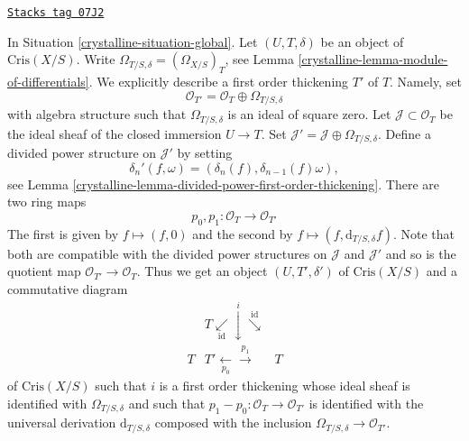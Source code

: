 \begin{remark}
\label{crystalline-remark-first-order-thickening}
\href{https://stacks.math.columbia.edu/tag/07J2}{\texttt{Stacks tag 07J2}}

In Situation \ref{crystalline-situation-global}.
Let $(U, T, \delta)$ be an object of $\text{Cris}(X/S)$.
Write $\Omega_{T/S, \delta} = (\Omega_{X/S})_T$, see
Lemma \ref{crystalline-lemma-module-of-differentials}.
We explicitly describe a first order thickening $T'$ of
$T$. Namely, set
$$
\mathcal{O}_{T'} = \mathcal{O}_T \oplus \Omega_{T/S, \delta}
$$
with algebra structure such that $\Omega_{T/S, \delta}$ is an
ideal of square zero. Let $\mathcal{J} \subset \mathcal{O}_T$
be the ideal sheaf of the closed immersion $U \to T$. Set
$\mathcal{J}' = \mathcal{J} \oplus \Omega_{T/S, \delta}$.
Define a divided power structure on $\mathcal{J}'$ by setting
$$
\delta_n'(f, \omega) = (\delta_n(f), \delta_{n - 1}(f)\omega),
$$
see Lemma \ref{crystalline-lemma-divided-power-first-order-thickening}.
There are two ring maps
$$
p_0, p_1 : \mathcal{O}_T \to \mathcal{O}_{T'}
$$
The first is given by $f \mapsto (f, 0)$ and the second by
$f \mapsto (f, \text{d}_{T/S, \delta}f)$. Note that both are compatible
with the divided power structures on $\mathcal{J}$ and $\mathcal{J}'$
and so is the quotient map $\mathcal{O}_{T'} \to \mathcal{O}_T$.
Thus we get an object $(U, T', \delta')$ of $\text{Cris}(X/S)$
and a commutative diagram
$$
\begin{array}{ccc} & T \underset{\text{id}}{\swarrow}\overset{i}{\downarrow}\overset{\text{id}}{\searrow} &  \\ T & T' \underset{p_0}{\longleftarrow}\overset{p_1}{\longrightarrow} & T\end{array}
$$
of $\text{Cris}(X/S)$ such that $i$ is a first order thickening whose ideal
sheaf is identified with $\Omega_{T/S, \delta}$ and such that
$p_1 - p_0 : \mathcal{O}_T \to \mathcal{O}_{T'}$
is identified with the universal derivation $\text{d}_{T/S, \delta}$
composed with the inclusion $\Omega_{T/S, \delta} \to \mathcal{O}_{T'}$.
\end{remark}

